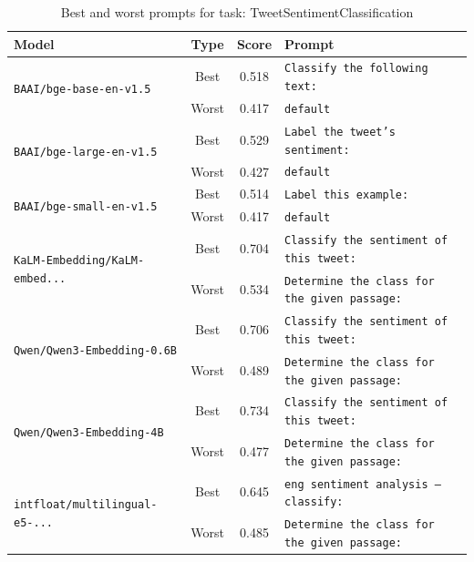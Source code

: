 \begin{table}[t]
\centering
\small
\caption{Best and worst prompts for task: TweetSentimentClassification}
\begin{tabular}{|p{}|c|c|p{}|}
\hline
Model & Type & Score & Prompt \\
\hline
\multirow{2}{=}{\raggedright\texttt{BAAI/\allowbreak bge-\allowbreak base-\allowbreak en-\allowbreak v1.5}} & Best & 0.518 & \texttt{Classify the following text:} \\
\cline{2-4}
& Worst & 0.417 & \texttt{default} \\
\hline
\multirow{2}{=}{\raggedright\texttt{BAAI/\allowbreak bge-\allowbreak large-\allowbreak en-\allowbreak v1.5}} & Best & 0.529 & \texttt{Label the tweet's sentiment:} \\
\cline{2-4}
& Worst & 0.427 & \texttt{default} \\
\hline
\multirow{2}{=}{\raggedright\texttt{BAAI/\allowbreak bge-\allowbreak small-\allowbreak en-\allowbreak v1.5}} & Best & 0.514 & \texttt{Label this example:} \\
\cline{2-4}
& Worst & 0.417 & \texttt{default} \\
\hline
\multirow{2}{=}{\raggedright\texttt{KaLM-\allowbreak Embedding/\allowbreak KaLM-\allowbreak embed...}} & Best & 0.704 & \texttt{Classify the sentiment of this tweet:} \\
\cline{2-4}
& Worst & 0.534 & \texttt{Determine the class for the given passage:} \\
\hline
\multirow{2}{=}{\raggedright\texttt{Qwen/\allowbreak Qwen3-\allowbreak Embedding-\allowbreak 0.6B}} & Best & 0.706 & \texttt{Classify the sentiment of this tweet:} \\
\cline{2-4}
& Worst & 0.489 & \texttt{Determine the class for the given passage:} \\
\hline
\multirow{2}{=}{\raggedright\texttt{Qwen/\allowbreak Qwen3-\allowbreak Embedding-\allowbreak 4B}} & Best & 0.734 & \texttt{Classify the sentiment of this tweet:} \\
\cline{2-4}
& Worst & 0.477 & \texttt{Determine the class for the given passage:} \\
\hline
\multirow{2}{=}{\raggedright\texttt{intfloat/\allowbreak multilingual-\allowbreak e5-\allowbreak ...}} & Best & 0.645 & \texttt{eng sentiment analysis – classify:} \\
\cline{2-4}
& Worst & 0.485 & \texttt{Determine the class for the given passage:} \\
\hline
\end{tabular}
\end{table}
